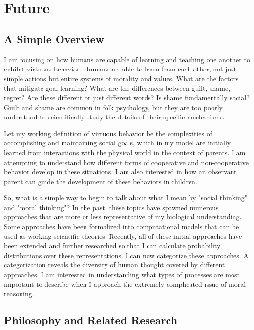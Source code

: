 \chapter{Future}\label{ch:future}

\section{A Simple Overview}

I am focusing on how humans are capable of learning and teaching one
another to exhibit virtuous behavior. Humans are able to learn from
each other, not just simple actions but entire systems of morality and
values. What are the factors that mitigate goal learning? What are the
differences between guilt, shame, regret? Are these different or just
different words? Is shame fundamentally social? Guilt and shame are
common in folk psychology, but they are too poorly understood to
scientifically study the details of their specific mechanisms.

Let my working definition of virtuous behavior be the complexities of
accomplishing and maintaining social goals, which in my model are
initially learned from interactions with the physical world in the
context of parents. I am attempting to understand how different
forms of cooperative and non-cooperative behavior develop in these
situations. I am also interested in how an observant parent can
guide the development of these behaviors in children.

So, what is a simple way to begin to talk about what I mean by
"social thinking" and "moral thinking"? In the past, these topics have
spawned numerous approaches that are more or less representative of
my biological understanding. Some approaches have been formalized
into computational models that can be used as working scientific
theories. Recently, all of these initial approaches have been extended
and further researched so that I can calculate probability
distributions over these representations. I can now categorize these
approaches. A categorization reveals the diversity of human thought
covered by different approaches. I am interested in understanding
what types of processes are most important to describe when I
approach the extremely complicated issue of moral reasoning.

\section{Philosophy and Related Research}

